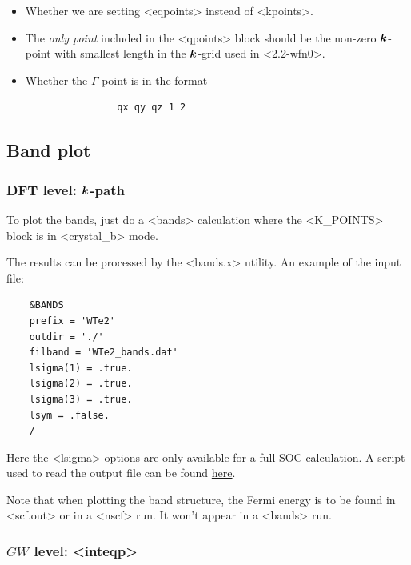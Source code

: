 \documentclass[hyperref, a4paper]{report}
\def\texttt#1{<#1>}%
\newcommand{\shortcode}[1]{\texttt{#1}}
\begin{document}
\begin{enumerate}
\begin{enumerate}
        \begin{itemize}
            \item Whether we are setting \shortcode{eqpoints} instead of \shortcode{kpoints}.
            \item The \emph{only point} included in the \shortcode{qpoints} block
            should be the non-zero $\vb*{k}$-point with smallest length 
            in the $\vb*{k}$-grid used in \shortcode{2.2-wfn0}.
            \item Whether the $\Gamma$ point is in the format 
            \begin{lstlisting}
                qx qy qz 1 2 
            \end{lstlisting}
        \end{itemize}
    \end{enumerate}
\end{enumerate}

\subsection{Band plot}

\subsubsection{DFT level: $\vb*{k}$-path}\label{sec:calculation.sop.bands.dft-path}

To plot the bands, 
just do a \shortcode{bands} calculation 
where the \shortcode{K_POINTS} block is in \shortcode{crystal_b} mode.

The results can be processed by the \shortcode{bands.x} utility.
An example of the input file:
\begin{lstlisting}
    &BANDS
    prefix = 'WTe2'
    outdir = './'
    filband = 'WTe2_bands.dat' 
    lsigma(1) = .true.
    lsigma(2) = .true.
    lsigma(3) = .true.
    lsym = .false.                                                        
    /
\end{lstlisting}
Here the \shortcode{lsigma} options are only available for a full SOC calculation.
A script used to read the output file 
can be found \href{./scripts/band-on-path/band-plot-example-2.jl}{here}.

Note that when plotting the band structure,
the Fermi energy is to be found in \shortcode{scf.out}
or in a \shortcode{nscf} run.
It won't appear in a \shortcode{bands} run.

\subsubsection{$GW$ level: \shortcode{inteqp}}
\end{document}
